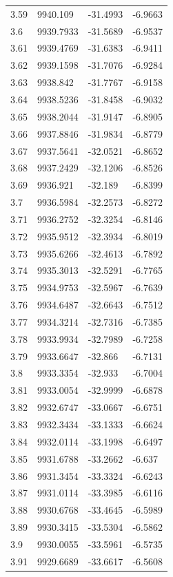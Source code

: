 \begin{table}[H]
\begin{tabular}{llll}
3.59 & 9940.109 & -31.4993 & -6.9663 \\
3.6 & 9939.7933 & -31.5689 & -6.9537 \\
3.61 & 9939.4769 & -31.6383 & -6.9411 \\
3.62 & 9939.1598 & -31.7076 & -6.9284 \\
3.63 & 9938.842 & -31.7767 & -6.9158 \\
3.64 & 9938.5236 & -31.8458 & -6.9032 \\
3.65 & 9938.2044 & -31.9147 & -6.8905 \\
3.66 & 9937.8846 & -31.9834 & -6.8779 \\
3.67 & 9937.5641 & -32.0521 & -6.8652 \\
3.68 & 9937.2429 & -32.1206 & -6.8526 \\
3.69 & 9936.921 & -32.189 & -6.8399 \\
3.7 & 9936.5984 & -32.2573 & -6.8272 \\
3.71 & 9936.2752 & -32.3254 & -6.8146 \\
3.72 & 9935.9512 & -32.3934 & -6.8019 \\
3.73 & 9935.6266 & -32.4613 & -6.7892 \\
3.74 & 9935.3013 & -32.5291 & -6.7765 \\
3.75 & 9934.9753 & -32.5967 & -6.7639 \\
3.76 & 9934.6487 & -32.6643 & -6.7512 \\
3.77 & 9934.3214 & -32.7316 & -6.7385 \\
3.78 & 9933.9934 & -32.7989 & -6.7258 \\
3.79 & 9933.6647 & -32.866 & -6.7131 \\
3.8 & 9933.3354 & -32.933 & -6.7004 \\
3.81 & 9933.0054 & -32.9999 & -6.6878 \\
3.82 & 9932.6747 & -33.0667 & -6.6751 \\
3.83 & 9932.3434 & -33.1333 & -6.6624 \\
3.84 & 9932.0114 & -33.1998 & -6.6497 \\
3.85 & 9931.6788 & -33.2662 & -6.637 \\
3.86 & 9931.3454 & -33.3324 & -6.6243 \\
3.87 & 9931.0114 & -33.3985 & -6.6116 \\
3.88 & 9930.6768 & -33.4645 & -6.5989 \\
3.89 & 9930.3415 & -33.5304 & -6.5862 \\
3.9 & 9930.0055 & -33.5961 & -6.5735 \\
3.91 & 9929.6689 & -33.6617 & -6.5608 \\

\end{tabular}
\end{table}
